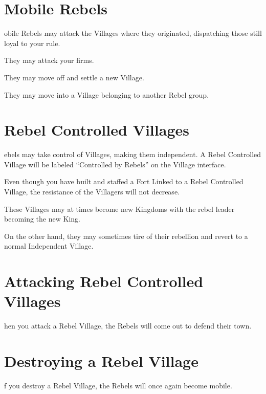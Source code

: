 \section{Mobile Rebels}


obile Rebels may attack the Villages where they originated, dispatching those still loyal to your rule.

They may attack your firms.

They may move off and settle a new Village.

They may move into a Village belonging to another Rebel group.

\section{Rebel Controlled Villages}


ebels may take control of Villages, making them independent. A Rebel Controlled Village will be labeled “Controlled by Rebels” on the Village interface.

Even though you have built and staffed a Fort Linked to a Rebel Controlled Village, the resistance of the Villagers will not decrease.

These Villages may at times become new Kingdoms with the rebel leader becoming the new King.

On the other hand, they may sometimes tire of their rebellion and revert to a normal Independent Village.

\section{Attacking Rebel Controlled Villages}


hen you attack a Rebel Village, the Rebels will come out to defend their town.

\section{Destroying a Rebel Village}


f you destroy a Rebel Village, the Rebels will once again become mobile.